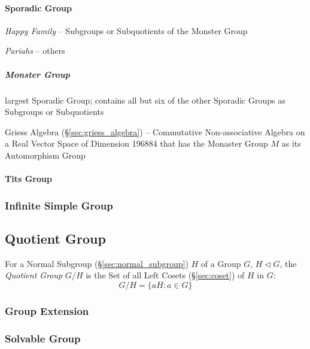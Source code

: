 \paragraph{Sporadic Group}\label{sec:sporadic_group}\hfill

\emph{Happy Family} -- Subgroups or Subquotients of the Monster Group

\emph{Pariahs} -- others



\subparagraph{Monster Group}\label{sec:monster_group}\hfill

largest Sporadic Group; contains all but six of the other Sporadic Groups as
Subgroups or Subquotients

Griess Algebra (\S\ref{sec:griess_algebra}) -- Commutative Non-associative
Algebra on a Real Vector Space of Dimension 196884 that has the Monaster Group
$M$ as its Automorphism Group



\paragraph{Tits Group}\label{sec:tits_group}\hfill



\subsubsection{Infinite Simple Group}\label{sec:infinite_simple_group}



\subsection{Quotient Group}\label{sec:quotient_group}

For a Normal Subgroup (\S\ref{sec:normal_subgroup}) $H$ of a Group
$G$, $H \triangleleft G$, the \emph{Quotient Group} $G/H$ is the Set
of all Left Cosets (\S\ref{sec:coset}) of $H$ in $G$:
\[
    G/H = \{ aH : a \in G \}
\]



\subsubsection{Group Extension}\label{sec:group_extension}

\subsubsection{Solvable Group}\label{sec:solvable_group}



